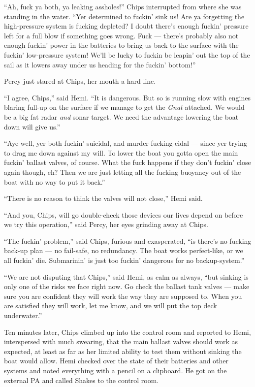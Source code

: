 \documentclass[
]{scrbook}
\begin{document}
``Ah, fuck ya both, ya leaking assholes!'' Chips interrupted from where
she was standing in the water. ``Yer determined to fuckin' sink us! Are
ya forgetting the high-pressure system is fucking depleted? I doubt
there's enough fuckin' pressure left for a full blow if something goes
wrong. Fuck --- there's probably also not enough fuckin' power in the
batteries to bring us back to the surface with the fuckin' low-pressure
system! We'll be lucky to fuckin be leapin' out the top of the sail as
it lowers away under us heading for the fuckin' bottom!''

Percy just stared at Chips, her mouth a hard line.

``I agree, Chips,'' said Hemi. ``It is dangerous. But so is running slow
with engines blaring full-up on the surface if we manage to get the
\emph{Gnat} attached. We would be a big fat radar \emph{and} sonar
target. We need the advantage lowering the boat down will give us.''

``Aye well, yer both fuckin' suicidal, and murder-fucking-cidal ---
since yer trying to drag me down against my will. To lower the boat you
gotta open the main fuckin' ballast valves, of course. What the fuck
happens if they don't fuckin' close again though, eh? Then we are just
letting all the fucking buoyancy out of the boat with no way to put it
back.''

``There is no reason to think the valves will not close,'' Hemi said.

``And you, Chips, will go double-check those devices our lives depend on
before we try this operation,'' said Percy, her eyes grinding away at
Chips.

``The fuckin' problem,'' said Chips, furious and exasperated, ``is
there's no fucking back-up plan --- no fail-safe, no redundancy. The
boat works perfect-like, or we all fuckin' die. Submarinin' is just too
fuckin' dangerous for no backup-system.''

``We are not disputing that Chips,'' said Hemi, as calm as always, ``but
sinking is only one of the risks we face right now. Go check the ballast
tank valves --- make sure you are confident they will work the way they
are supposed to. When you are satisfied they will work, let me know, and
we will put the top deck underwater.''

\bigskip

Ten minutes later, Chips climbed up into the control room and reported
to Hemi, interspersed with much swearing, that the main ballast valves
should work as expected, at least as far as her limited ability to test
them without sinking the boat would allow. Hemi checked over the state
of their batteries and other systems and noted everything with a pencil
on a clipboard. He got on the external PA and called Shakes to the
control room.
\end{document}
